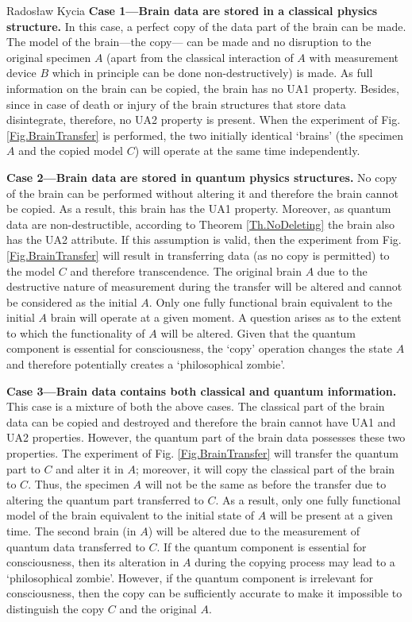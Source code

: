 \begin{artengenv}{Radosław Kycia}
\textbf{Case 1---Brain data are stored in a classical physics structure.} In this case, a perfect copy of the data part of the brain can be made. The model of the brain---the copy--- can be made and no disruption to the original specimen $A$ (apart from the classical interaction of $A$ with measurement device $B$ which in principle can be done non-destructively) is made. As full information on the brain can be copied, the brain has no UA1 property. Besides, since in case of death or injury of the brain structures that store data disintegrate, therefore, no UA2 property is present. When the experiment of Fig. \ref{Fig.BrainTransfer} is performed, the two initially identical `brains' (the specimen $A$ and the copied model $C$) will operate at the same time independently.


\textbf{Case 2---Brain data are stored in quantum physics structures.} No copy of the brain can be performed without altering it and therefore the brain cannot be copied. As a result, this brain has the UA1 property. Moreover, as quantum data are non-destructible, according to Theorem \ref{Th.NoDeleting} the brain also has the UA2 attribute. If this assumption is valid, then the experiment from Fig. \ref{Fig.BrainTransfer} will result in transferring data (as no copy is permitted) to the model $C$ and therefore transcendence. The original brain $A$ due to the destructive nature of measurement during the transfer will be altered and cannot be considered as the initial $A$. Only one fully functional brain equivalent to the initial $A$ brain will operate at a given moment. A question arises as to the extent to which the functionality of $A$ will be altered. Given that the quantum component is essential for consciousness, the `copy' operation changes the state $A$ and therefore potentially creates a `philosophical zombie'.


\textbf{Case 3---Brain data contains both classical and quantum information.} This case is a mixture of both the above cases. The classical part of the brain data can be copied and destroyed and therefore the brain cannot have UA1 and UA2 properties. However, the quantum part of the brain data possesses these two properties. The experiment of Fig. \ref{Fig.BrainTransfer} will transfer the quantum part to $C$ and alter it in $A$; moreover, it will copy the classical part of the brain to $C$. Thus, the specimen $A$ will not be the same as before the transfer due to altering the quantum part transferred to $C$. As a result, only one fully functional model of the brain equivalent to the initial state of $A$ will be present at a given time. The second brain (in $A$) will be altered due to the measurement of quantum data transferred to $C$. If the quantum component is essential for consciousness, then its alteration in $A$ during the copying process may lead to a `philosophical zombie'. However, if the quantum component is irrelevant for consciousness, then the copy can be sufficiently accurate to make it impossible to distinguish the copy $C$ and the original $A$.


\end{artengenv}
